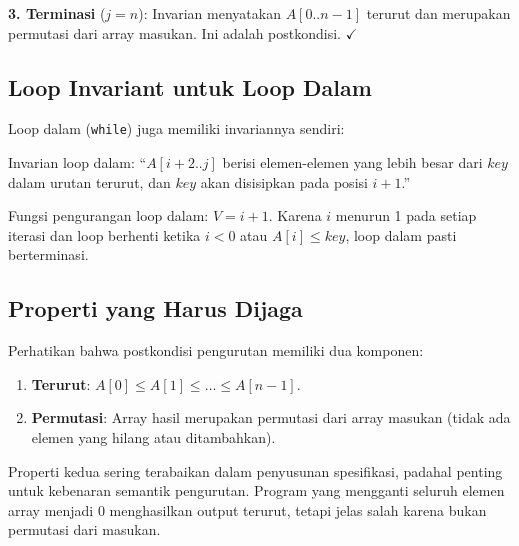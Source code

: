 \textbf{3. Terminasi} ($j = n$): Invarian menyatakan $A[0..n-1]$ terurut dan merupakan permutasi dari array masukan. Ini adalah postkondisi. $\checkmark$

\subsection{Loop Invariant untuk Loop Dalam}

Loop dalam (\texttt{while}) juga memiliki invariannya sendiri:

\begin{konsep}
Invarian loop dalam: ``$A[i+2..j]$ berisi elemen-elemen yang lebih besar dari $key$ dalam urutan terurut, dan $key$ akan disisipkan pada posisi $i+1$.''

Fungsi pengurangan loop dalam: $V = i + 1$. Karena $i$ menurun 1 pada setiap iterasi dan loop berhenti ketika $i < 0$ atau $A[i] \leq key$, loop dalam pasti berterminasi.
\end{konsep}

\subsection{Properti yang Harus Dijaga}

Perhatikan bahwa postkondisi pengurutan memiliki dua komponen:
\begin{enumerate}
    \item \textbf{Terurut}: $A[0] \leq A[1] \leq \ldots \leq A[n-1]$.
    \item \textbf{Permutasi}: Array hasil merupakan permutasi dari array masukan (tidak ada elemen yang hilang atau ditambahkan).
\end{enumerate}

Properti kedua sering terabaikan dalam penyusunan spesifikasi, padahal penting untuk kebenaran semantik pengurutan. Program yang mengganti seluruh elemen array menjadi $0$ menghasilkan output terurut, tetapi jelas salah karena bukan permutasi dari masukan.
